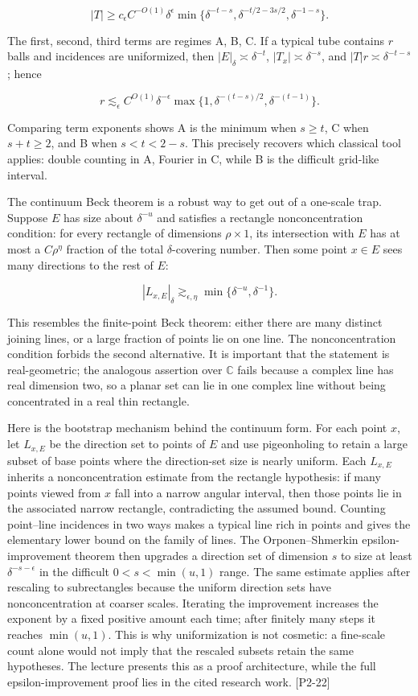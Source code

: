 \[|T|\ge c_\epsilon C^{-O(1)}\delta^\epsilon\min\{\delta^{-t-s},\delta^{-t/2-3s/2},\delta^{-1-s}\}.\]

The first, second, third terms are regimes A, B, C. If a typical tube contains \(r\) balls and incidences are uniformized, then \(|E|_\delta\asymp\delta^{-t}\), \(|T_x|\asymp\delta^{-s}\), and \(|T|r\asymp\delta^{-t-s}\); hence

\[r\lesssim_\epsilon C^{O(1)}\delta^{-\epsilon}\max\{1,\delta^{-(t-s)/2},\delta^{-(t-1)}\}.\]

Comparing term exponents shows A is the minimum when \(s\ge t\), C when \(s+t\ge2\), and B when \(s<t<2-s\). This precisely recovers which classical tool applies: double counting in A, Fourier in C, while B is the difficult grid-like interval.

The continuum Beck theorem is a robust way to get out of a one-scale trap. Suppose \(E\) has size about \(\delta^{-u}\) and satisfies a rectangle nonconcentration condition: for every rectangle of dimensions \(\rho\times1\), its intersection with \(E\) has at most a \(C\rho^\eta\) fraction of the total \(\delta\)-covering number. Then some point \(x\in E\) sees many directions to the rest of \(E\):

\[|L_{x,E}|_\delta\gtrsim_{\epsilon,\eta}\min\{\delta^{-u},\delta^{-1}\}.\]

This resembles the finite-point Beck theorem: either there are many distinct joining lines, or a large fraction of points lie on one line. The nonconcentration condition forbids the second alternative. It is important that the statement is real-geometric; the analogous assertion over \(\mathbb C\) fails because a complex line has real dimension two, so a planar set can lie in one complex line without being concentrated in a real thin rectangle.

Here is the bootstrap mechanism behind the continuum form. For each point \(x\), let \(L_{x,E}\) be the direction set to points of \(E\) and use pigeonholing to retain a large subset of base points where the direction-set size is nearly uniform. Each \(L_{x,E}\) inherits a nonconcentration estimate from the rectangle hypothesis: if many points viewed from \(x\) fall into a narrow angular interval, then those points lie in the associated narrow rectangle, contradicting the assumed bound. Counting point--line incidences in two ways makes a typical line rich in points and gives the elementary lower bound on the family of lines. The Orponen--Shmerkin epsilon-improvement theorem then upgrades a direction set of dimension \(s\) to size at least \(\delta^{-s-\epsilon}\) in the difficult \(0<s<\min(u,1)\) range. The same estimate applies after rescaling to subrectangles because the uniform direction sets have nonconcentration at coarser scales. Iterating the improvement increases the exponent by a fixed positive amount each time; after finitely many steps it reaches \(\min(u,1)\). This is why uniformization is not cosmetic: a fine-scale count alone would not imply that the rescaled subsets retain the same hypotheses. The lecture presents this as a proof architecture, while the full epsilon-improvement proof lies in the cited research work. {[}P2-22{]}

